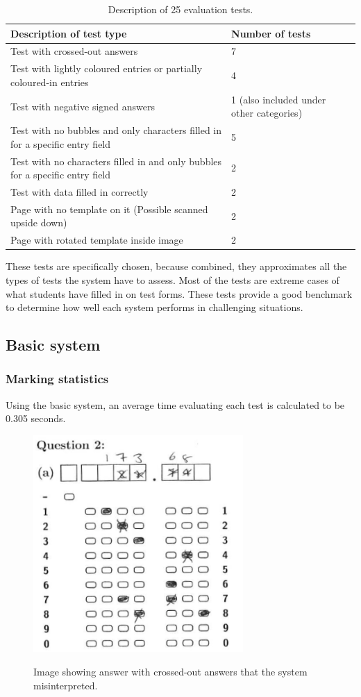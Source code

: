 \begin{table}
\caption{Description of 25 evaluation tests.} \label{tbl:25Tests}
  \centering
\begin{tabular}{|p{6cm}|p{4cm}|}
\hline
\textbf{Description of test type}&\textbf{Number of tests}\\
\hline
Test with crossed-out answers&7\\
\hline
Test with lightly coloured entries or partially coloured-in entries&4\\
\hline
Test with negative signed answers&1 (also included under other categories)\\
\hline
Test with no bubbles and only characters filled in for a specific entry field &5\\
\hline
Test with no characters filled in and only bubbles for a specific entry field&2\\
\hline
Test with data filled in correctly&2\\
\hline
Page with no template on it (Possible scanned upside down)&2\\
\hline
Page with rotated template inside image&2\\
\hline
\end{tabular} 
\end{table}

These tests are specifically chosen, because combined, they approximates all the types of tests the system have to assess. Most of the tests are extreme cases of what students have filled in on test forms. These tests provide a good benchmark to determine how well each system performs in challenging situations.

\subsection{Basic system}
\subsubsection{Marking statistics}

Using the basic system, an average time evaluating each test is calculated to be 0.305 seconds. 

\begin{figure}
  \centering
  \includegraphics[width=8cm]{crossClash}\\
  \caption{Image showing answer with crossed-out answers that the system misinterpreted.}
  \label{fig:crossClash}
\end{figure}

